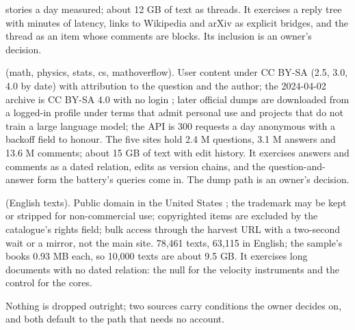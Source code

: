 \documentclass[11pt]{article}
\theoremstyle{plain}
\theoremstyle{definition}
\theoremstyle{remark}
\begin{document}
\begin{description}
    stories a day measured; about 12 GB of text as threads. It exercises a reply tree with
    minutes of latency, links to Wikipedia and arXiv as explicit bridges, and the thread as an item
    whose comments are blocks. Its inclusion is an owner's decision.
  \item[Stack Exchange] (math, physics, stats, cs, mathoverflow). User content under CC BY-SA (2.5,
    3.0, 4.0 by date) with attribution to the question and the author; the 2024-04-02 archive is
    CC BY-SA 4.0 with no login \citep{stackexchange2024dump}; later official dumps are downloaded
    from a logged-in profile under terms that admit personal use and projects that do not train a
    large language model; the API is 300 requests a day anonymous with a backoff field to honour.
    The five sites hold 2.4 M questions, 3.1 M answers and 13.6 M comments; about 15 GB of text with
    edit history. It exercises answers and comments as a dated relation, edits as version chains,
    and the question-and-answer form the battery's queries come in. The dump path is an owner's
    decision.
  \item[Project Gutenberg] (English texts). Public domain in the United States
    \citep{gutenberg2026policy}; the trademark may be kept or stripped for non-commercial use;
    copyrighted items are excluded by the catalogue's rights field; bulk access through the
    harvest URL with a two-second wait or a mirror, not the main site. 78,461 texts, 63,115 in
    English; the sample's books 0.93 MB each, so 10,000 texts are about 9.5 GB. It exercises long
    documents with no dated relation: the null for the velocity instruments and the control for
    the cores.
\end{description}
Nothing is dropped outright; two sources carry conditions the owner decides on, and both default
to the path that needs no account.
\end{document}
